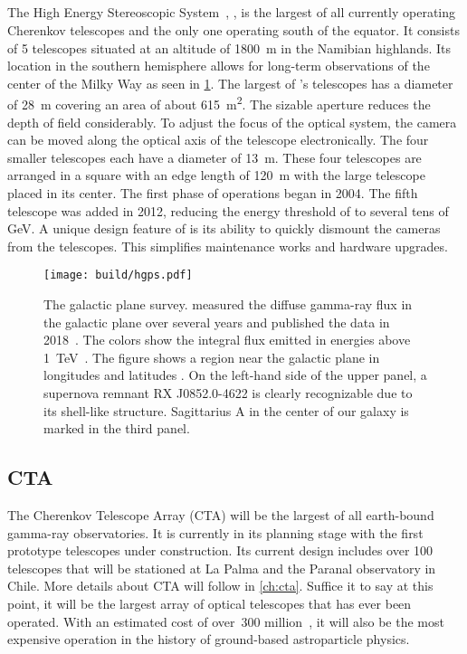 \subsection{\hess}
The High Energy Stereoscopic System~\cite{hess}, \hess, is the largest of all currently operating Cherenkov telescopes and the only one operating 
south of the equator.
It consists of 5 telescopes situated at an altitude of \SI{1800}{\metre} in the Namibian highlands.  
Its location in the southern hemisphere allows for long-term observations of the center of the Milky Way as seen in \cref{fig:hgps}.
The largest of \hess's telescopes has a diameter of \SI{28}{\metre} covering an area of about \SI{615}{\square\metre}.
The sizable aperture reduces the depth of field considerably. To adjust the focus of the optical system, 
the camera can be moved along the optical axis of the telescope electronically.   
The four smaller telescopes each have a diameter of \SI{13}{\metre}. These four telescopes are arranged in a square
with an edge length of \SI{120}{\metre} with the large telescope placed in its center.
The first phase of \hess operations began in 2004. The fifth telescope was added in 2012, reducing 
the energy threshold of \hess to several tens of \si{GeV}. 
A unique design feature of \hess is its ability to quickly dismount the cameras from the telescopes. This simplifies 
maintenance works and hardware upgrades.

\begin{figure}
  \centering
  \texttt{[image: build/hgps.pdf]}
  \caption[The \hess galactic plane survey]{The \hess galactic plane survey. \hess measured the diffuse gamma-ray flux in the galactic plane over several years and published the
  data in 2018~\cite{hess_gps}. The colors show the integral flux emitted in energies above \SI{1}{TeV}~\cite[\S4.3.2]{hess_gps}.
  The figure shows a region near the galactic plane in longitudes \protect{}
  and latitudes \protect{}. On the left-hand side of the upper panel, a supernova remnant
  RX J0852.0-4622 is clearly recognizable due to its shell-like structure.
  Sagittarius A in the center of our galaxy is marked in the third panel.}
  \label{fig:hgps}
\end{figure}

\subsection{CTA}

The Cherenkov Telescope Array (CTA) will be the largest of all earth-bound gamma-ray observatories. 
It is currently in its planning stage with the first prototype telescopes under construction. 
Its current design includes over 100 telescopes that will be stationed at La Palma and the Paranal observatory in Chile.
More details about CTA will follow in \cref{ch:cta}. Suffice it to say at this point, it will be the largest array of optical telescopes that 
has ever been operated. With an estimated cost of over \texteuro\,\num{300} million~\cite{cta_website}, it will also be the
most expensive operation in the history of ground-based astroparticle physics.

